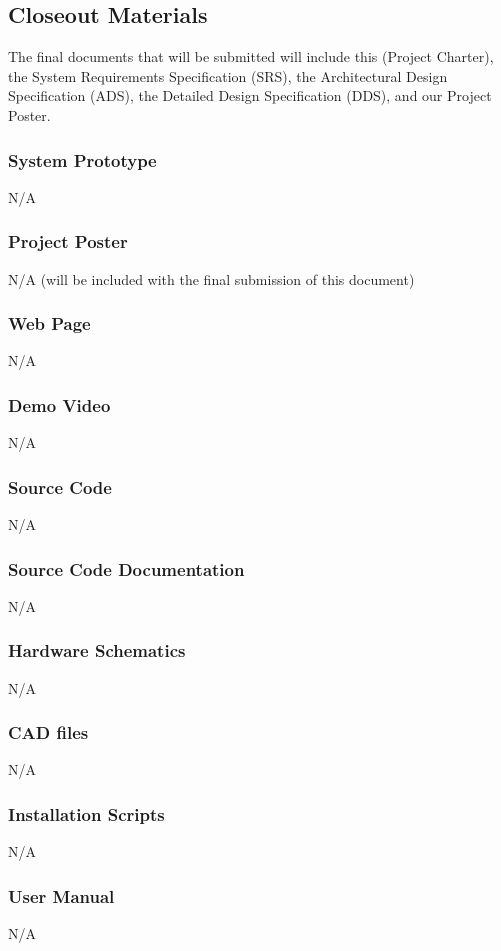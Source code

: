 \subsection{Closeout Materials}
The final documents that will be submitted will include this (Project Charter), the System Requirements Specification (SRS), the Architectural Design Specification (ADS), the Detailed Design Specification (DDS), and our Project Poster.

\subsubsection{System Prototype}
N/A

\subsubsection{Project Poster}
N/A (will be included with the final submission of this document)

\subsubsection{Web Page}
N/A

\subsubsection{Demo Video}
N/A

\subsubsection{Source Code}
N/A

\subsubsection{Source Code Documentation}
N/A

\subsubsection{Hardware Schematics}
N/A

\subsubsection{CAD files}
N/A

\subsubsection{Installation Scripts}
N/A

\subsubsection{User Manual}
N/A